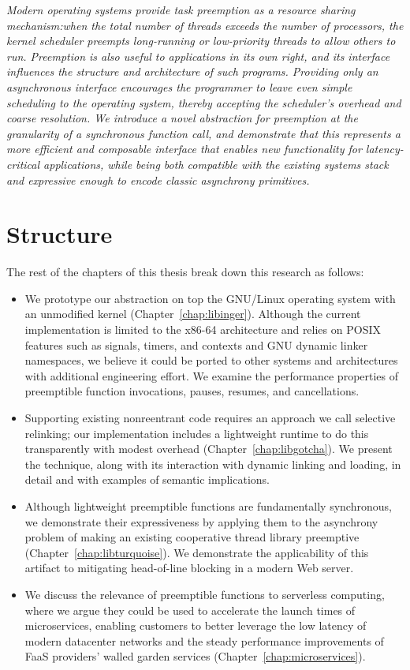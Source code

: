 \documentclass[12pt,letterpaper,openright]{report}
\begin{document}
\textit{Modern operating systems provide task preemption
as a resource sharing mechanism:\@ when the total number of
threads exceeds the number of processors, the kernel scheduler preempts long-running
or low-priority threads to allow others to run.  Preemption is also useful to
applications in its own right, and its interface
influences the structure and architecture of such programs.
Providing only an asynchronous interface encourages the programmer to leave even
simple scheduling to the operating system, thereby accepting the scheduler's overhead
and coarse resolution.  We introduce a novel
abstraction for preemption at the granularity of a synchronous function call, and
demonstrate that this represents a more efficient and composable interface that
enables new functionality for latency-critical applications, while being both
compatible with the existing systems stack and expressive enough
to encode classic asynchrony primitives.
}


\section{Structure}

The rest of the chapters of this thesis break down this research as follows:
\begin{itemize}
\item We prototype our abstraction on top the GNU/Linux operating system with an
	unmodified kernel (Chapter~\ref{chap:libinger}).  Although the current
	implementation is limited to the x86-64 architecture and relies on POSIX
	features such as signals, timers, and contexts and GNU dynamic linker
	namespaces, we believe it could be ported to other systems and architectures
	with additional engineering effort.  We examine the performance properties of
	preemptible function invocations, pauses, resumes, and cancellations.
\item Supporting existing nonreentrant code requires an approach we call selective
	relinking; our implementation includes a lightweight runtime to do this
	transparently with modest overhead (Chapter~\ref{chap:libgotcha}).  We
	present the technique, along with its interaction with dynamic linking and
	loading, in detail and with examples of semantic implications.
\item Although lightweight preemptible functions are fundamentally synchronous, we
	demonstrate their expressiveness by applying them to the asynchrony problem
	of making an existing cooperative thread library preemptive
	(Chapter~\ref{chap:libturquoise}).  We demonstrate the applicability of this
	artifact to mitigating head-of-line blocking in a modern Web server.
\item We discuss the relevance of preemptible functions to serverless computing,
	where we argue they could be used to accelerate the launch times of
	microservices, enabling customers to better leverage the low latency of
	modern datacenter networks and the steady performance improvements of FaaS
	providers' walled garden services (Chapter~\ref{chap:microservices}).
\end{itemize}
\end{document}
